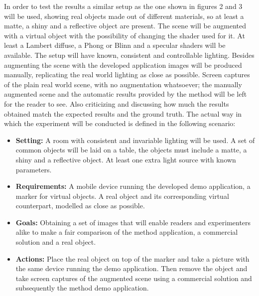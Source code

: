 
In order to test the results a similar setup as the one shown in figures 2 and 3 will be used, showing real objects made out of different materials, so at least a matte, a shiny and a reflective object are present. The scene will be augmented with a virtual object with the possibility of changing the shader used for it. At least a Lambert diffuse, a Phong or Blinn and a specular shaders will be available. The setup will have known,  consistent and controllable lighting.\newline
Besides augmenting the scene with the developed application images will be produced manually, replicating the real world lighting as close as possible. Screen captures of the plain real world scene, with no augmentation whatsoever; the manually augmented scene and the automatic results provided by the method will be left for the reader to see. Also criticizing and discussing how much the results obtained match the expected results and the ground truth.\newline
The actual way in which the experiment will be conducted is defined in the following scenario:
\begin{itemize}
    \item \textbf{Setting:} A room with consistent and invariable lighting will be used. A set of common objects will be laid on a table, the objects must include a matte, a shiny and a reflective object. At least one extra light source with known parameters.
    \item \textbf{Requirements:} A mobile device running the developed demo application, a marker for virtual objects. A real object and its corresponding virtual counterpart, modelled as close as possible. 
    \item \textbf{Goals:} Obtaining a set of images that will enable readers and experimenters alike to make a fair comparison of the method application, a commercial solution and a real object.
    \item \textbf{Actions:} Place the real object on top of the marker and take a picture with the same device running the demo application. Then remove the object and take screen captures of the augmented scene using a commercial solution and subsequently the method demo application.
\end{itemize}
